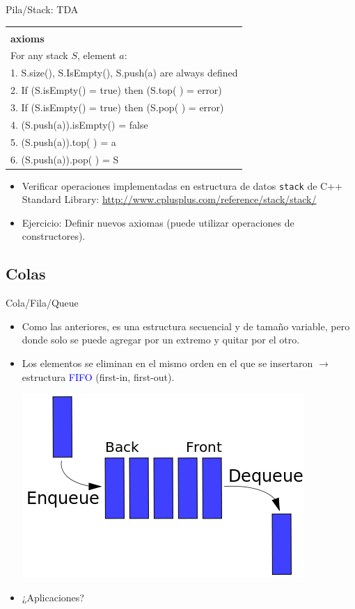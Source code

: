 \documentclass{beamer} %
\newcommand{\blue}[1]{\textcolor{blue}{#1}}
\begin{document}
\begin{frame}{Pila/Stack: TDA}
    \scriptsize{
    \begin{tabular}{p{87ex}}\hline\\[-1ex]
      {\bf\normalsize axioms}\\
      For any stack $S$, element $a$:\\[1.2ex]
      1. S.size(), S.IsEmpty(), S.push(a) are always defined\\
      2. If (S.isEmpty() = true) then (S.top( ) = error)\\
      3. If (S.isEmpty() = true) then (S.pop( ) = error)\\
      4. (S.push(a)).isEmpty() = false\\
      5. (S.push(a)).top( ) = a\\
      6. (S.push(a)).pop( ) = S\\[1.5ex]\hline
    \end{tabular}

    \begin{itemize}
        \item<2-> Verificar operaciones implementadas en estructura de datos \texttt{stack} de C++ Standard Library: \url{http://www.cplusplus.com/reference/stack/stack/}
        \item<2-> Ejercicio: Definir nuevos axiomas (puede utilizar operaciones de constructores).
    \end{itemize}}
\end{frame}

\subsection{Colas}

\begin{frame}{Cola/Fila/Queue}
    \begin{itemize}
        \item<1-> Como las anteriores, es una estructura secuencial y de tamaño variable, pero donde solo se puede agregar por un extremo y quitar por el otro.
        \item<2-> Los elementos se eliminan en el mismo orden en el que se insertaron $\to$ estructura \blue{FIFO} (first-in, first-out).
        \smallskip
        
        \begin{center}
            \includegraphics[width=.5\textwidth]{./image/cap2/queue.png}
        \end{center}
        \item<3-> ¿Aplicaciones? 
    \end{itemize}
\end{frame}
\end{document}
